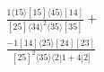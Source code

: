 \documentclass[varwidth, border=5pt]{standalone}
\begin{document}
\begin{my}
$\begin{gathered}
\scriptscriptstyle\frac{1⟨15⟩[15]⟨45⟩[14]}{[25]⟨34⟩^2⟨35⟩[35]}+\\
\scriptscriptstyle\frac{-1[14]⟨25⟩[24][23]}{[25]^2⟨35⟩⟨2|1+4|2]}\phantom{+}
\end{gathered}$
\end{my}
\end{document}
